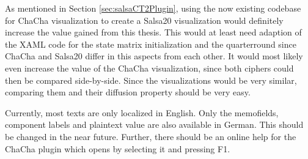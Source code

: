 \begin{description}[style=nextline]
\item[Salsa20 visualization]

As mentioned in Section \ref{sec:salsaCT2Plugin}, using the now existing codebase for ChaCha visualization to create a Salsa20 visualization would definitely increase the value gained from this thesis. This would at least need adaption of the XAML code for the state matrix initialization and the quarterround since ChaCha and Salsa20 differ in this aspects from each other. It would most likely even increase the value of the ChaCha visualization, since both ciphers could then be compared side-by-side. Since the visualizations would be very similar, comparing them and their diffusion property should be very easy.

\item[Localization and online help]

Currently, most texts are only localized in English. Only the memofields, component labels and plaintext value are also available in German. This should be changed in the near future. Further, there should be an online help for the ChaCha plugin which opens by selecting it and pressing F1.

\end{description}

